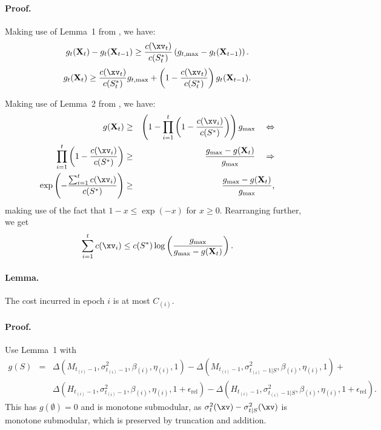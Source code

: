 \documentclass[a4paper,10pt]{article}
\begin{document}
\paragraph{Proof.}
Making use of Lemma~1 from \citet{the_budgeted_maximum_covering_problem}, we have:
\begin{equation}
    g_t(\mathbf{X}_t) - g_t(\mathbf{X}_{t-1}) \ge \frac{c(\xv_t)}{c(S_t^*)} \left( g_{t,\mathrm{max}} - g_t(\mathbf{X}_{t-1}) \right)\mathrm{.}
\end{equation}
\begin{equation}
    g_t(\mathbf{X}_t) \ge \frac{c(\xv_t)}{c(S_t^*)} g_{t,\mathrm{max}} + \left(1 - \frac{c(\xv_t)}{c(S_t^*)}\right) g_t(\mathbf{X}_{t-1})\mathrm{.}
\end{equation}


Making use of Lemma~2 from \citet{the_budgeted_maximum_covering_problem}, we have:
\begin{eqnarray*}
    g(\mathbf{X}_t) & \ge & \left(1 - \prod_{i=1}^{t} \left(1 - \frac{c(\xv_i)}{c(S^*)}\right)\right) g_{\mathrm{max}} \quad \Leftrightarrow\\
    \prod_{i=1}^{t} \left(1 - \frac{c(\xv_i)}{c(S^*)}\right) & \ge & \frac{g_{\mathrm{max}} - g(\mathbf{X}_t)}{g_{\mathrm{max}}} \quad \Rightarrow\\
    \exp\left(-\frac{\sum_{i=1}^{t} c(\xv_i)}{c(S^*)}\right) & \ge & \frac{g_{\mathrm{max}} - g(\mathbf{X}_t)}{g_{\mathrm{max}}}\textrm{,}
\end{eqnarray*}
making use of the fact that $1-x \le \exp(-x)$ for $x \ge 0$. Rearranging further, we get
\begin{equation}
    \sum_{i=1}^{t} c(\xv_i) \le c(S^*) \log\left(\frac{g_{\mathrm{max}}}{g_{\mathrm{max}} - g(\mathbf{X}_t)}\right)\textrm{.}
\end{equation}


\paragraph{Lemma.} The cost incurred in epoch $i$ is at most $C_{(i)}$.

\paragraph{Proof.} Use Lemma~1 with
\begin{eqnarray*}
    g(S) & = & \Delta(M_{t_{(i)}-1}, \sigma_{t_{(i)}-1}^2, \beta_{(i)}, \eta_{(i)}, 1) - \Delta(M_{t_{(i)}-1}, \sigma_{t_{(i)}-1|S}^2, \beta_{(i)}, \eta_{(i)}, 1) + \\
                    &&\Delta(H_{t_{(i)}-1}, \sigma_{t_{(i)}-1}^2, \beta_{(i)}, \eta_{(i)}, 1 + \epsilon_{\mathrm{rel}}) - \Delta(H_{t_{(i)}-1}, \sigma_{t_{(i)}-1|S}^2, \beta_{(i)}, \eta_{(i)}, 1 + \epsilon_{\mathrm{rel}})\textrm{.}
\end{eqnarray*}
This has $g(\emptyset) = 0$ and is monotone submodular, as $\sigma_{t}^2(\xv) - \sigma_{t|S}^2(\xv)$ is monotone submodular, which is preserved by truncation and addition.
\end{document}
